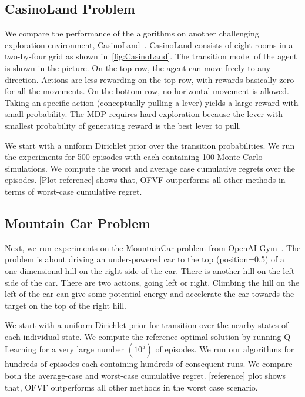 \documentclass{article}
\theoremstyle{plain}
\theoremstyle{definition}
\begin{document}
\subsection{CasinoLand Problem}
We compare the performance of the algorithms on another challenging exploration environment, CasinoLand~\citep{Strehl2004}. CasinoLand consists of eight rooms in a two-by-four grid as shown in~\cref{fig:CasinoLand}. The transition model of the agent is shown in the picture. On the top row, the agent can move freely to any direction. Actions are less rewarding on the top row, with rewards basically zero for all the movements. On the bottom row, no horizontal movement is allowed. Taking an specific action (conceptually pulling a lever) yields a large reward with small probability. The MDP requires hard exploration because the lever with smallest probability of generating reward is the best lever to pull.

We start with a uniform Dirichlet prior over the transition probabilities. We run the experiments for 500 episodes with each containing 100 Monte Carlo simulations. We compute the worst and average case cumulative regrets over the episodes. [Plot reference] shows that, OFVF outperforms all other methods in terms of worst-case cumulative regret.

\subsection{Mountain Car Problem}
Next, we run experiments on the MountainCar problem from OpenAI Gym~\citep{openai}. The problem is about driving an under-powered car to the top (position=0.5) of a one-dimensional hill on the right side of the car. There is another hill on the left side of the car. There are two actions, going left or right. Climbing the hill on the left of the car can give some potential energy and accelerate the car towards the target on the top of the right hill.

We start with a uniform Dirichlet prior for transition over the nearby states of each individual state. We compute the reference optimal solution by running Q-Learning for a very large number $(10^5)$ of episodes. We run our algorithms for hundreds of episodes each containing hundreds of consequent runs. We compare both the average-case and worst-case cumulative regret. [reference] plot shows that, OFVF outperforms all other methods in the worst case scenario.


\end{document}
